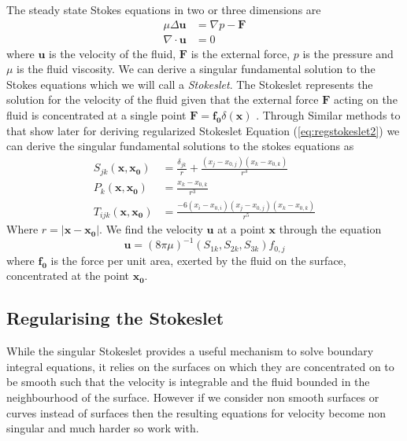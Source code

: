 The steady state Stokes equations in two or three dimensions are
\begin{subequations}
\label{eq:StokesFlow}
\begin{align}
    \mu\Delta\boldsymbol{u} &= \nabla p - \boldsymbol{F} \label{eq:StokesFlow1} \\
    \nabla \cdot \boldsymbol{u} &= 0 \label{eq:StokesFlow2}
\end{align}
\end{subequations}
where $\mathbf{u}$ is the velocity of the fluid, $\mathbf{F}$ is the external force, $p$ is the pressure and $\mu$ is the fluid viscosity.
We can derive a singular fundamental solution to the Stokes equations which we will call a \textit{Stokeslet}. The Stokeslet represents the solution for the velocity of the fluid given that the external force $\mathbf{F}$ acting on the fluid is concentrated at a single point $\mathbf{F} = \mathbf{f_0}\delta(\mathbf{x})$ \cite{Hancock1953TheLiquids, Batchelor2000AnDynamics, Pozrikidis1992BoundaryFlow}.
Through Similar methods to that show later for deriving regularized Stokeslet Equation (\cref{eq:regstokeslet2}) we can derive the singular fundamental solutions to the stokes equations as
\begin{equation}
\label{eq:singularsolutions}
\begin{aligned}
    S_{j k}(\mathbf{x}, \mathbf{x_0}) &= \frac{\delta_{j k}}{r}+\frac{\left(x_{j}-x_{0,j}\right)\left(x_{k}-x_{0,k}\right)}{r^{3}} \\
    P_{k}(\mathbf{x}, \mathbf{x_0}) &= \frac{x_{k}-x_{0,k}}{r^{3}} \\
    T_{ijk}(\mathbf{x}, \mathbf{x_0}) &= \frac{-6\left(x_{i}-x_{0,i}\right)\left(x_{j}-x_{0,j}\right)\left(x_{k}-x_{0,k}\right)}{r^5}
\end{aligned}
\end{equation}
Where $r=|\mathbf{x}-\mathbf{x_0}|$. We find the velocity $\mathbf{u}$ at a point $\mathbf{x}$ through the equation
\begin{equation*}
    \mathbf{u} = (8 \pi \mu)^{-1} \left(S_{1k},S_{2k},S_{3k}\right)f_{0,j}
\end{equation*}
where $\mathbf{f_{0}}$ is the force per unit area, exerted by the fluid on the surface, concentrated at the point $\mathbf{x_0}$.


\subsection{Regularising the Stokeslet}
While the singular Stokeslet provides a useful mechanism to solve boundary integral equations, it relies on the surfaces on which they are concentrated on to be smooth such that the velocity is integrable and the fluid bounded in the neighbourhood of the surface. However if we consider non smooth surfaces or curves instead of surfaces then the resulting equations for velocity become non singular and much harder so work with.

